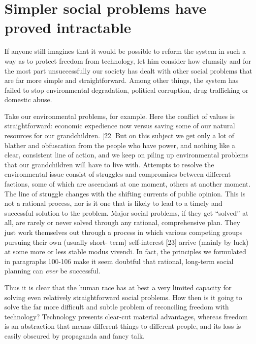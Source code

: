 \chapter{Simpler social problems have proved intractable}

 If anyone still imagines that it would be possible to reform the system in such a way as to protect freedom from technology, let him consider how clumsily and for the most part unsuccessfully our society has dealt with other social problems that are far more simple and straightforward. Among other things, the system has failed to stop environmental degradation, political corruption, drug trafficking or domestic abuse.

 Take our environmental problems, for example. Here the conflict of values is straightforward: economic expedience now versus saving some of our natural resources for our grandchildren. [22] But on this subject we get only a lot of blather and obfuscation from the people who have power, and nothing like a clear, consistent line of action, and we keep on piling up environmental problems that our grandchildren will have to live with. Attempts to resolve the environmental issue consist of struggles and compromises between different factions, some of which are ascendant at one moment, others at another moment. The line of struggle changes with the shifting currents of public opinion. This is not a rational process, nor is it one that is likely to lead to a timely and successful solution to the problem. Major social problems, if they get “solved” at all, are rarely or never solved through any rational, comprehensive plan. They just work themselves out through a process in which various competing groups pursuing their own (usually short- term) self-interest [23] arrive (mainly by luck) at some more or less stable modus vivendi. In fact, the principles we formulated in paragraphs 100-106 make it seem doubtful that rational, long-term social planning can {\em ever} be successful.

 Thus it is clear that the human race has at best a very limited capacity for solving even relatively straightforward social problems. How then is it going to solve the far more difficult and subtle problem of reconciling freedom with technology? Technology presents clear-cut material advantages, whereas freedom is an abstraction that means different things to different people, and its loss is easily obscured by propaganda and fancy talk.


